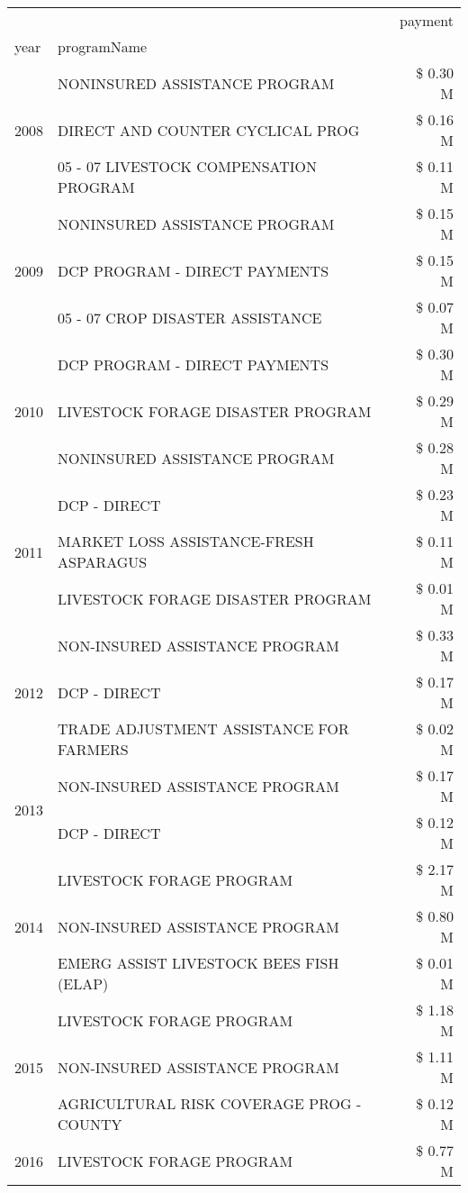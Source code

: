 \begin{tabular}{llr}
\toprule
 &  & payment \\
year & programName &  \\
\midrule
\multirow[t]{3}{*}{2008} & NONINSURED ASSISTANCE PROGRAM & \$ 0.30 M \\
 & DIRECT AND COUNTER CYCLICAL PROG & \$ 0.16 M \\
 & 05 - 07 LIVESTOCK COMPENSATION PROGRAM & \$ 0.11 M \\
\cline{1-3}
\multirow[t]{3}{*}{2009} & NONINSURED ASSISTANCE PROGRAM & \$ 0.15 M \\
 & DCP PROGRAM - DIRECT PAYMENTS & \$ 0.15 M \\
 & 05 - 07 CROP DISASTER ASSISTANCE & \$ 0.07 M \\
\cline{1-3}
\multirow[t]{3}{*}{2010} & DCP PROGRAM - DIRECT PAYMENTS & \$ 0.30 M \\
 & LIVESTOCK FORAGE DISASTER  PROGRAM & \$ 0.29 M \\
 & NONINSURED ASSISTANCE PROGRAM & \$ 0.28 M \\
\cline{1-3}
\multirow[t]{3}{*}{2011} & DCP - DIRECT & \$ 0.23 M \\
 & MARKET LOSS ASSISTANCE-FRESH ASPARAGUS & \$ 0.11 M \\
 & LIVESTOCK FORAGE DISASTER PROGRAM & \$ 0.01 M \\
\cline{1-3}
\multirow[t]{3}{*}{2012} & NON-INSURED ASSISTANCE PROGRAM & \$ 0.33 M \\
 & DCP - DIRECT & \$ 0.17 M \\
 & TRADE ADJUSTMENT ASSISTANCE FOR FARMERS & \$ 0.02 M \\
\cline{1-3}
\multirow[t]{2}{*}{2013} & NON-INSURED ASSISTANCE PROGRAM & \$ 0.17 M \\
 & DCP - DIRECT & \$ 0.12 M \\
\cline{1-3}
\multirow[t]{3}{*}{2014} & LIVESTOCK FORAGE PROGRAM & \$ 2.17 M \\
 & NON-INSURED ASSISTANCE PROGRAM & \$ 0.80 M \\
 & EMERG ASSIST LIVESTOCK BEES FISH (ELAP) & \$ 0.01 M \\
\cline{1-3}
\multirow[t]{3}{*}{2015} & LIVESTOCK FORAGE PROGRAM & \$ 1.18 M \\
 & NON-INSURED ASSISTANCE PROGRAM & \$ 1.11 M \\
 & AGRICULTURAL RISK COVERAGE PROG - COUNTY & \$ 0.12 M \\
\cline{1-3}
\multirow[t]{3}{*}{2016} & LIVESTOCK FORAGE PROGRAM                      & \$ 0.77 M \\

\end{tabular}
